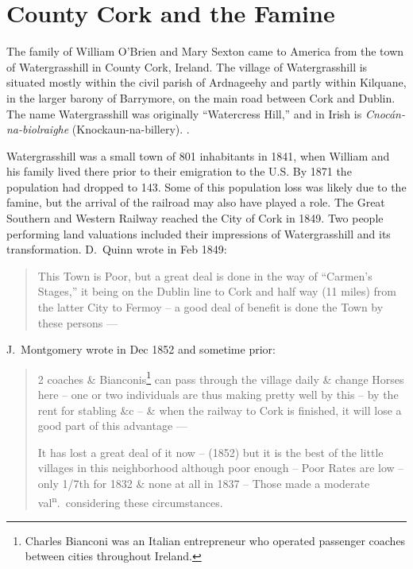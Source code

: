 \section{County Cork and the Famine}

The family of William O'Brien and Mary Sexton came to America from the town of Watergrasshill in County Cork, Ireland.\citep{Edward2OBrienNaturalization,Michael2OBrienNaturalization,Margaret3DooleyBaptism} The village of Watergrasshill is situated mostly within the civil parish of Ardnageehy and partly within Kilquane, in the larger barony of Barrymore, on the main road between Cork and Dublin.\citep{TopographicalDictionary} The name Watergrasshill was originally ``Watercress Hill,'' and in Irish is \textit{Cnoc\'{a}n-na-biolraighe} (Knockaun-na-billery).\citep{LocalNames} .

Watergrasshill was a small town of 801 inhabitants in 1841, when William and his family lived there prior to their emigration to the U.S. By 1871 the population had dropped to 143.\citep{Population} Some of this population loss was likely due to the famine, but the arrival of the railroad may also have played a role. The Great Southern and Western Railway reached the City of Cork in 1849.\citep{Bianconi} Two people performing land valuations included their impressions of Watergrasshill and its transformation. D.\ Quinn wrote in Feb 1849:

\begin{quote}
	This Town is Poor, but a great deal is done in the way of ``Carmen's Stages,'' it being on the Dublin line to Cork and half way (11 miles) from the latter City to Fermoy -- a good deal of benefit is done the Town by these persons ---\citep{HouseIntro}
\end{quote}

J.\ Montgomery wrote in Dec 1852 and sometime prior:

\begin{quote}
	2 coaches \& Bianconis\footnote{Charles Bianconi was an Italian entrepreneur who operated passenger coaches between cities throughout Ireland.\citep{Bianconi}} can pass through the village daily \& change Horses here -- one or two individuals are thus making pretty well by this -- by the rent for stabling \&c -- \& when the railway to Cork is finished, it will lose a good part of this advantage ---
	
	It has lost a great deal of it now -- (1852) but it is the best of the little villages in this neighborhood although poor enough -- Poor Rates are low -- only 1/7th for 1832 \& none at all in 1837 -- Those made a moderate val\textsuperscript{n}.\ considering these circumstances.\citep{HouseIntro}
\end{quote}

